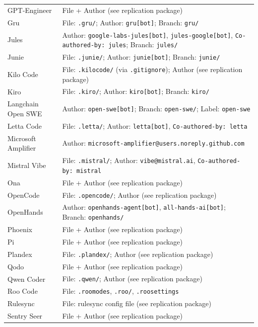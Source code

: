 \begin{small}
\begin{longtable}{@{}p{3.0cm}p{11.5cm}@{}}
GPT-Engineer     & File + Author (see replication package) \\
Gru              & File: \texttt{.gru/}; Author: \texttt{gru[bot]}; Branch: \texttt{gru/} \\
Jules            & Author: \texttt{google-labs-jules[bot]}, \texttt{jules-google[bot]}, \texttt{Co-authored-by: jules}; Branch: \texttt{jules/} \\
Junie            & File: \texttt{.junie/}; Author: \texttt{junie[bot]}; Branch: \texttt{junie/} \\
Kilo Code        & File: \texttt{.kilocode/} (via \texttt{.gitignore}); Author (see replication package) \\
Kiro             & File: \texttt{.kiro/}; Author: \texttt{kiro[bot]}; Branch: \texttt{kiro/} \\
Langchain Open SWE & Author: \texttt{open-swe[bot]}; Branch: \texttt{open-swe/}; Label: \texttt{open-swe} \\
Letta Code       & File: \texttt{.letta/}; Author: \texttt{letta[bot]}, \texttt{Co-authored-by: letta} \\
Microsoft Amplifier & Author: \texttt{microsoft-amplifier@users.noreply.github.com} \\
Mistral Vibe     & File: \texttt{.mistral/}; Author: \texttt{vibe@mistral.ai}, \texttt{Co-authored-by: mistral} \\
Ona              & File + Author (see replication package) \\
OpenCode         & File: \texttt{.opencode/}; Author (see replication package) \\
OpenHands        & Author: \texttt{openhands-agent[bot]}, \texttt{all-hands-ai[bot]}; Branch: \texttt{openhands/} \\
Phoenix          & File + Author (see replication package) \\
Pi               & File + Author (see replication package) \\
Plandex          & File: \texttt{.plandex/}; Author (see replication package) \\
Qodo             & File + Author (see replication package) \\
Qwen Coder       & File: \texttt{.qwen/}; Author (see replication package) \\
Roo Code         & File: \texttt{.roomodes}, \texttt{.roo/}, \texttt{.roosettings} \\
Rulesync         & File: rulesync config file (see replication package) \\
Sentry Seer      & File + Author (see replication package) \\

\end{longtable}
\end{small}
